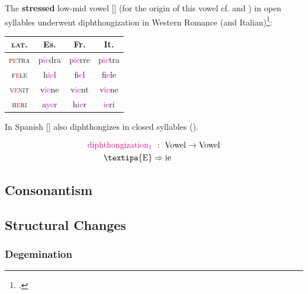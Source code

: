 \documentclass{report}[12pt]
\begin{document}
The \textbf{stressed} low-mid vowel [] (for the origin of this vowel cf.  and ) in open syllables underwent diphthongization in Western Romance (and Italian)\footcite[p.~15-16]{romance_his}:
\begin{center}
\begin{tabular}{c c c c}
  \textsc{lat.} & Es. & Fr. & It. \\
  \hline
  \textsc{p\textcolor{red}{e}tra} & p\textcolor{magenta}{ie}dra & p\textcolor{magenta}{ie}rre & p\textcolor{magenta}{ie}tra \\
  \textsc{f\textcolor{red}{e}le} & h\textcolor{magenta}{ie}l & f\textcolor{magenta}{ie}l & f\textcolor{magenta}{ie}le \\
  \textsc{v\textcolor{red}{e}nit} & v\textcolor{magenta}{ie}ne & v\textcolor{magenta}{ie}nt & v\textcolor{magenta}{ie}ne \\
  \textsc{h\textcolor{red}{e}ri} & a\textcolor{magenta}{ye}r & h\textcolor{magenta}{ie}r & \textcolor{magenta}{ie}ri \\
\end{tabular}
\end{center}
In Spanish [] also diphthongizes in closed syllables ().

\begin{tcolorbox}
  \begin{align*}
    \text{\textcolor{magenta}{diphthongization$_1$}} &\ :\ \text{Vowel} \rightarrow \text{Vowel} \\
    \text{\textipa{E}} & \Rightarrow \text{ie} \\
  \end{align*}
\end{tcolorbox}

\subsection{Consonantism}

\subsection{Structural Changes}

\subsubsection{Degemination}

\begin{tcolorbox}
  
\end{tcolorbox}
\end{document}
